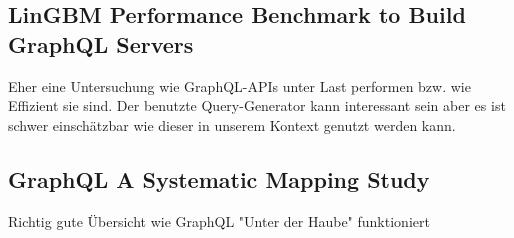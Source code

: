 \subsection{LinGBM Performance Benchmark to Build GraphQL Servers}
Eher eine Untersuchung wie GraphQL-APIs unter Last performen bzw. wie Effizient sie sind.
Der benutzte Query-Generator kann interessant sein aber es ist schwer einschätzbar wie dieser in unserem Kontext genutzt werden
kann.

\subsection{GraphQL A Systematic Mapping Study}
Richtig gute Übersicht wie GraphQL "Unter der Haube" funktioniert


